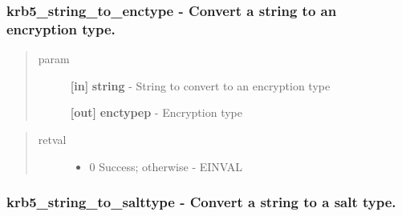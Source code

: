 \documentclass[letterpaper,10pt,english]{sphinxmanual}
\begin{document}
\subsubsection{krb5\_string\_to\_enctype -  Convert a string to an encryption type.}
\label{appdev/refs/api/krb5_string_to_enctype::doc}\label{appdev/refs/api/krb5_string_to_enctype:krb5-string-to-enctype-convert-a-string-to-an-encryption-type}

\begin{fulllineitems}
\label{appdev/refs/api/krb5_string_to_enctype:krb5_string_to_enctype}
\end{fulllineitems}

\begin{quote}\begin{description}
\item[{param}] \leavevmode
\textbf{{[}in{]}} \textbf{string} - String to convert to an encryption type

\textbf{{[}out{]}} \textbf{enctypep} - Encryption type

\end{description}\end{quote}
\begin{quote}\begin{description}
\item[{retval}] \leavevmode\begin{itemize}
\item {} 
0   Success; otherwise - EINVAL

\end{itemize}

\end{description}\end{quote}


\subsubsection{krb5\_string\_to\_salttype -  Convert a string to a salt type.}
\label{appdev/refs/api/krb5_string_to_salttype:krb5-string-to-salttype-convert-a-string-to-a-salt-type}\label{appdev/refs/api/krb5_string_to_salttype::doc}

\begin{fulllineitems}
\label{appdev/refs/api/krb5_string_to_salttype:krb5_string_to_salttype}
\end{fulllineitems}
\end{document}

